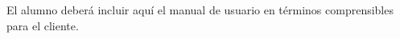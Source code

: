 \label{sec:usersGuide}

\begin{shaded}
El alumno deberá incluir aquí el manual de usuario en términos comprensibles para el cliente.
\end{shaded}